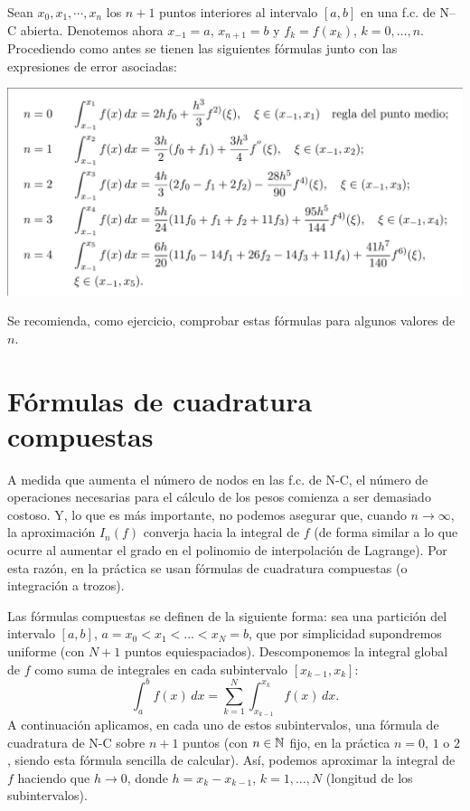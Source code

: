 \begin{example}
  Sean $x_0,x_1,\cdots,x_n$ los $n+1$ puntos interiores al intervalo
  $[a,b]$ en una f.c. de N--C abierta. Denotemos ahora $x_{-1}=a$,
  $x_{n+1}=b$ y $f_k=f(x_k)$, $k=0,\dots,n$. Procediendo como antes
  se tienen las siguientes fórmulas junto con las expresiones de error
  asociadas:
  \begin{center}
    \includegraphics[width=0.95\linewidth]{tema3/formulas-nc-abiertas}
  \end{center}
  Se recomienda, como ejercicio, comprobar estas fórmulas para algunos
  valores de $n$.
\end{example}

\section{Fórmulas de cuadratura compuestas}
\label{sec:fc-compuestas}

A medida que aumenta el número de nodos en las f.c. de N-C, el número
de operaciones necesarias para el cálculo de los pesos comienza a ser
demasiado costoso. Y, lo que es más importante, no podemos asegurar
que, cuando $n\to\infty$, la aproximación $I_n(f)$ converja hacia la
integral de $f$ (de forma similar a lo que ocurre al
aumentar el grado en el polinomio de interpolación de Lagrange). Por
esta razón, en la práctica se usan fórmulas de cuadratura
compuestas (o integración a trozos).

Las fórmulas compuestas se definen de la siguiente forma: sea una
partición del intervalo $[a,b]$, $a=x_0<x_1<...<x_N=b$, que por
simplicidad supondremos uniforme (con $N+1$ puntos
equiespaciados).  Descomponemos
la integral global de $f$ como suma de integrales en cada subintervalo
$[x_{k-1},x_k]$:
\begin{equation*}
  \int_a^b f(x)\,dx = \sum_{k=1}^N \int_{x_{k-1}}^{x_k}f(x)\,dx.
\end{equation*}
A continuación aplicamos, en cada uno de estos subintervalos, una
fórmula de cuadratura de N-C sobre $n+1$ puntos (con $n\in\operatorname{{\mathbb N}}$ fijo,
en la práctica $n=0$, $1$ o $2$, siendo esta fórmula sencilla
de calcular). Así, podemos aproximar la integral de $f$ haciendo que
$h\to 0$, donde $h=x_k-x_{k-1}$, $k=1,...,N$ (longitud de los
subintervalos).

